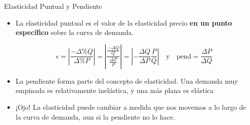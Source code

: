 \documentclass{beamer}
\begin{document}
\begin{frame}{Elasticidad Puntual y Pendiente}
  \begin{itemize}
      \vspace{2mm}
    \item La elasticidad puntual es el valor de la elasticidad precio \textbf{en un punto específico} sobre la curva de demanda. 
  \begin{footnotesize}
    \begin{equation*}
      \epsilon = \left|\frac{- \Delta \% Q}{\Delta \% P}\right| = \left|\frac{\frac{- \Delta Q}{Q}}{\frac{\Delta P}{P}}\right| = \left|-\frac{\Delta Q}{\Delta P} \frac{P}{Q}\right|\,\,\,\,\,\,\text{y}\,\,\,\,\,\, \text{pend} = \frac{\Delta P}{\Delta Q}
    \end{equation*}
    
  \end{footnotesize}
    \item La pendiente forma parte del concepto de elasticidad. Una demanda muy empinada es relativamente inelástica, y una más plana es elástica
    \item ¡Ojo! La elasticidad puede cambiar a medida que nos movemos a lo largo de la curva de demanda, aun si la pendiente no lo hace.
    \vspace{-2mm}
  \end{itemize}
    \begin{center}
    \begin{figure}[H]
    \begin{center}
    \end{center}
    \end{figure}
    \end{center}

\end{frame}
\end{document}
